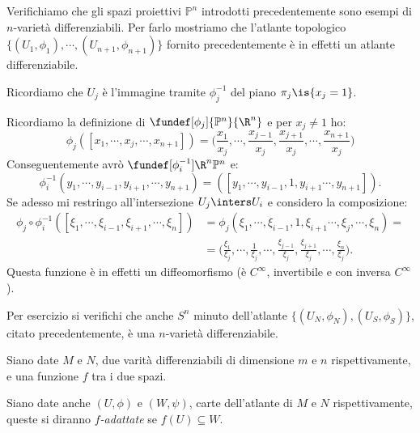 

\begin{es}
Verifichiamo che gli spazi proiettivi $\mathbb{P}^n$ introdotti precedentemente sono esempi di $n$-varietà differenziabili. Per farlo mostriamo che l'atlante topologico $\{(U_1,\phi_1),\cdots,(U_{n+1},\phi_{n+1})\}$ fornito precedentemente è in effetti un atlante differenziabile.

Ricordiamo che $U_j$ è l'immagine tramite $\phi_j^{-1}$ del piano $\pi_{j}\is \{x_{j}=1 \}$.

Ricordiamo la definizione di $\fundef[\phi_j]{\mathbb{P}^n}{\R^n}$ e per $x_j \neq 1$ ho:
\begin{equation*}
\phi_j([x_1,\cdots,x_j,\cdots,x_{n+1}])=\Big (\frac{x_1}{x_j},\cdots,\frac{x_{j-1}}{x_j},\frac{x_{j+1}}{x_j},\cdots,\frac{x_{n+1}}{x_j} \Big )
\end{equation*}
Conseguentemente avrò $\fundef[\phi_i^{-1}]{\R^n}{\mathbb{P}^n}$ e:
\begin{equation*}
\phi_i^{-1}(y_1,\cdots,y_{i-1},y_{i+1},\cdots,y_{n+1})=([y_1,\cdots,y_{i-1},1,y_{i+1}\cdots,y_{n+1}]).
\end{equation*}
Se adesso mi restringo all'intersezione $U_j \inters U_i$ e considero la composizione:
\begin{equation*}
\begin{split}
\phi_j \circ \phi_i^{-1}([\xi_1,\cdots,\xi_{i-1},\xi_{i+1},\cdots,\xi_n])& =\phi_j(\xi_1,\cdots,\xi_{i-1},1,\xi_{i+1}\cdots,\xi_j,\cdots,\xi_n)=\\
& =\Big (\frac{\xi_1}{\xi_j},\cdots,\frac{1}{\xi_j},\cdots,\frac{\xi_{j-1}}{\xi_j},\frac{\xi_{j+1}}{\xi_j},\cdots,\frac{\xi_n}{\xi_j}\Big ).
\end{split}
\end{equation*}
Questa funzione è in effetti un diffeomorfismo (è $C^\infty$, invertibile e con inversa $C^\infty$).


Per esercizio si verifichi che anche $S^n$ minuto dell'atlante $\{(U_N,\phi_N),(U_S,\phi_S)\}$, citato precedentemente, è una $n$-varietà differenziabile.
\end{es}

\begin{defn}
Siano date $M$ e $N$, due varità differenziabili di dimensione $m$ e $n$ rispettivamente, e una funzione $f$ tra i due spazi.

Siano date anche $(U,\phi)$ e $(W,\psi)$, carte dell'atlante di $M$ e $N$ rispettivamente, queste si diranno \emph{$f$-adattate} se $f(U)\subseteq W.$
\end{defn}


